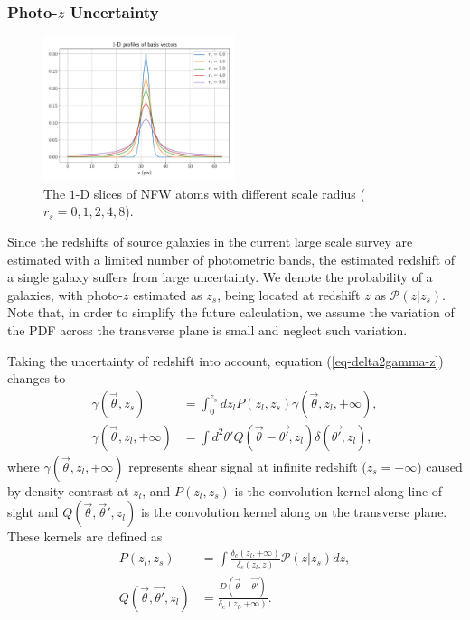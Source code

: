 \documentclass[twocolumn]{aastex62}
\newcommand{\vecb}[1]{{#1}}
\begin{document}
\subsubsection{Photo-$z$ Uncertainty}
\begin{figure}
 \includegraphics[width=0.5\textwidth]{nfwlet-atom-1D.pdf}
 \caption{The $1$-D slices of NFW atoms with different scale radius ($r_s=0,1,2,4,8$).}
\end{figure}
Since the redshifts of source galaxies in the current large scale survey are estimated with a limited 
number of photometric bands, the estimated redshift of a single galaxy suffers from large uncertainty. 
We denote the probability of a galaxies, with photo-$z$ estimated as $z_s$, being  located at redshift 
$z$ as $\mathcal{P}(z|z_s)$.  Note that, in order to simplify the future calculation, we assume the 
variation of the PDF across the transverse plane is small and neglect such variation.

Taking the uncertainty of redshift into account, equation (\ref{eq-delta2gamma-z}) changes to
\begin{equation}\label{eq-delta2gamma-poz}
\begin{split}
\gamma(\vec{\theta},z_s) &= \int_0^{z_s} dz_l P(z_l,z_s)\gamma(\vec{\theta},z_l,+\infty),\\
\gamma(\vec{\theta},z_l,+\infty)&= \int d^2 \theta'   Q(\vec{\theta}-\vec{\theta'},z_l) \delta(\vec{\theta'},z_l),
\end{split}
\end{equation}
where $\gamma(\vec{\theta},z_l,+\infty)$ represents shear signal at infinite redshift ($z_s=+\infty$) caused by density contrast at $z_l$, and $P(z_l,z_s)$ is the convolution kernel along line-of-sight and $Q(\vec{\theta},\vec{\theta}',z_l)$ is the convolution kernel along on the transverse plane. These kernels are defined as
\begin{equation}
\begin{split}
P(z_l,z_s)&=\int \frac{\delta_c(z_l,+\infty)}{\delta_{c}(z_l,z)} \mathcal{P}(z|z_s) dz,\\
Q(\vec{\theta},\vec{\theta'},z_l)&=\frac{\vecb{D}(\vec{\theta}-\vec{\theta'})}{\delta_c(z_l,+\infty)}.
\end{split}
\end{equation}
\end{document}

